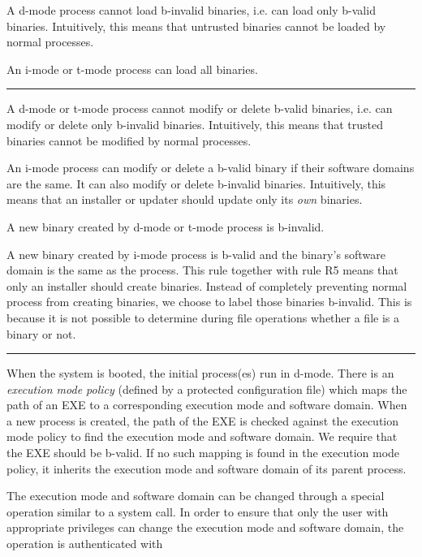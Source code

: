 \begin{description}
\setlength{\itemsep}{0pt}
\setlength{\parskip}{0pt}
\setlength{\parsep}{0pt}
\item[R1]
A d-mode process cannot load b-invalid binaries,
i.e. can load only b-valid binaries.
Intuitively, this means that untrusted binaries cannot be loaded
by normal processes.
\item[R2]
An i-mode or t-mode process can load all binaries.
\hrule width 12cm
\smallskip
\item[R3]
A d-mode or t-mode process cannot modify or delete b-valid binaries,
i.e. can modify or delete only b-invalid binaries.
Intuitively, this means that trusted binaries cannot be modified
by normal processes.
\item[R4]
An i-mode process can modify or delete a b-valid binary
if their software domains are the same.
It can also modify or delete b-invalid binaries.
Intuitively, this means that an installer or updater should update
only its {\em own} binaries.
\item[R5]
A new binary created by d-mode or t-mode process is b-invalid.
\item[R6]
A new binary created by i-mode process is b-valid and the binary's software domain is
the same as the process.
This rule together with rule R5 means that only an installer
should create binaries.
Instead of completely preventing normal process from creating binaries,
we choose to label those binaries b-invalid. This is because it is
not possible to determine during file operations 
whether a file is a binary or not.
\hrule width 12cm
\smallskip
\item[R7]
When the system is booted, the initial process(es) run in d-mode.
There is an {\em execution mode policy} (defined by a protected 
configuration file)
which maps the path of an EXE to a corresponding execution mode and software domain.
When a new process is created, the path of the EXE is checked against the
execution mode policy to find the execution mode and software domain.
We require that the EXE should be b-valid.
If no such mapping is found in the execution mode policy, 
it inherits the execution mode and software domain of its parent process.
\item[R8]
The execution mode and software domain can be changed through a special operation
similar to a system call.
In order to ensure that only the user with appropriate privileges
can change the execution mode and software domain, the operation is authenticated with

\end{description}
